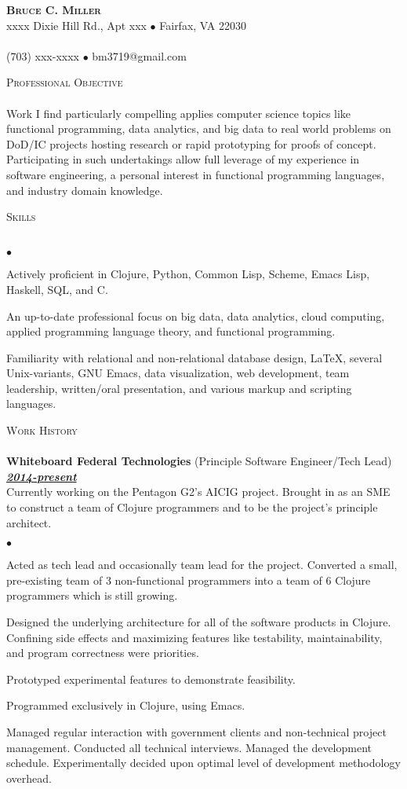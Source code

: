 \documentclass{article}
\newcommand{\lineunder}{\vspace*{-8pt} \\ \hspace*{-18pt} \hrulefill \\}
\newcommand{\header}[1]{{\hspace*{-15pt}\vspace*{7pt} \textsc{#1}} \vspace*{-7pt} \lineunder}
\newcommand{\employer}[3]{{ \textbf{#1} (#2)\\ \underline{\textbf{\emph{#3}}}\\  }}
\newcommand{\contact}[3]{
\vspace*{-8pt}
\begin{center}
{\LARGE \scshape {#1}}\\
#2 \lineunder
#3
\end{center}
\vspace*{-8pt}
}
\newenvironment{achievements}{\begin{list}{$\bullet$}{\topsep 0pt \itemsep
      -2pt}}{\vspace*{4pt}\end{list}}
\begin{document}
\small
\smallskip
\vspace*{-44pt}

\contact{\textbf{Bruce C. Miller}}
{xxxx Dixie Hill Rd., Apt xxx $\bullet$ Fairfax, VA 22030}
{(703) xxx-xxxx $\bullet$ bm3719@gmail.com}

\header{Professional Objective} Work I find particularly compelling applies
computer science topics like functional programming, data analytics, and big
data to real world problems on DoD/IC projects hosting research or rapid
prototyping for proofs of concept.  Participating in such undertakings allow
full leverage of my experience in software engineering, a personal interest in
functional programming languages, and industry domain knowledge.  \vspace{7pt}

\header{Skills}
\begin{achievements}
\item Actively proficient in Clojure, Python, Common Lisp, Scheme, Emacs Lisp,
  Haskell, SQL, and C.
\item An up-to-date professional focus on big data, data analytics, cloud
  computing, applied programming language theory, and functional programming.
\item Familiarity with relational and non-relational database design, \LaTeX,
  several Unix-variants, GNU Emacs, data visualization, web development, team
  leadership, written/oral presentation, and various markup and scripting
  languages.
\end{achievements}

\header{Work History}

\employer{Whiteboard Federal Technologies}{Principle Software Engineer/Tech
  Lead}{2014-present} Currently working on the Pentagon G2's AICIG project.
Brought in as an SME to construct a team of Clojure programmers and to be the
project's principle architect.
\begin{achievements}
\item Acted as tech lead and occasionally team lead for the project.  Converted
  a small, pre-existing team of 3 non-functional programmers into a team of 6
  Clojure programmers which is still growing.
\item Designed the underlying architecture for all of the software products in
  Clojure.  Confining side effects and maximizing features like testability,
  maintainability, and program correctness were priorities.
\item Prototyped experimental features to demonstrate feasibility.
\item Programmed exclusively in Clojure, using Emacs.
\item Managed regular interaction with government clients and non-technical
  project management.  Conducted all technical interviews.  Managed the
  development schedule.  Experimentally decided upon optimal level of
  development methodology overhead.
\end{achievements}
\end{document}
